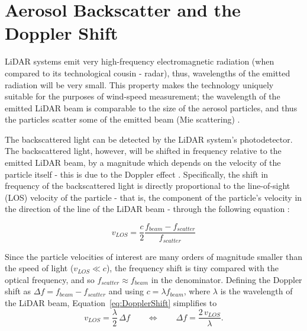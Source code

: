 
    \section{Aerosol Backscatter and the Doppler Shift}
    LiDAR systems emit very high-frequency electromagnetic radiation (when compared to its technological cousin - radar), thus, wavelengths of the emitted radiation will be very small. This property makes the technology uniquely suitable for the purposes of wind-speed measurement; the wavelength of the emitted LiDAR beam is comparable to the size of the aerosol particles, and thus the particles scatter some of the emitted beam (Mie scattering) \cite{mikkelsen_spinner-integrated_2013}.
    
    The backscattered light can be detected by the LiDAR system's photodetector. The backscattered light, however, will be shifted in frequency relative to the emitted LiDAR beam, by a magnitude which depends on the velocity of the particle itself - this is due to the Doppler effect \cite{Doppler1842}. Specifically, the shift in frequency of the backscattered light is directly proportional to the  line-of-sight (LOS) velocity of the particle - that is, the component of the particle's velocity in the direction of the line of the LiDAR beam - through the following equation \cite{letizia_characterization_2023}:

    \begin{equation}
        v_{LOS} = \frac{c}{2}\frac{f_{beam}-f_{scatter}}{f_{scatter}} 
        \label{eq:DopplerShift}
    \end{equation}
    
    Since the particle velocities of interest are many orders of magnitude smaller than the speed
    of light ($v_{LOS} \ll c$), the frequency shift is tiny compared with the optical frequency,
    and so $f_{scatter} \approx f_{beam}$ in the denominator. Defining the Doppler shift as
    $\Delta f = f_{beam} - f_{scatter}$ and using $c = \lambda f_{beam}$, where $\lambda$ is the
    wavelength of the LiDAR beam, Equation~\ref{eq:DopplerShift} simplifies to
    \begin{equation}
    	v_{LOS} = \frac{\lambda}{2}\,\Delta f
    	\qquad \Longleftrightarrow \qquad
    	\Delta f = \frac{2\,v_{LOS}}{\lambda} .
    	\label{eqn:DopplerSimple}
    \end{equation}
    
